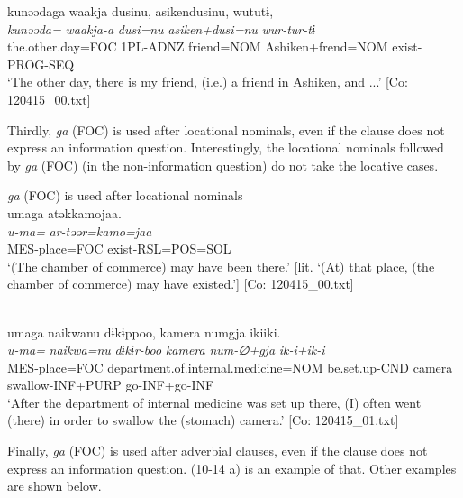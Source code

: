   \ex%
      \glll    kunəədaga  waakja  dusinu,  asikendusinu,                                     wututɨ,\\
      \textit{kunəəda=}  \textit{waakja-a}  \textit{dusi=nu}  \textit{asiken+dusi=nu}  \textit{wur-tur-tɨ}\\
      the.other.day=FOC  1PL-ADNZ  friend=NOM  Ashiken+frend=NOM                         exist-PROG-SEQ\\
      \glt       ‘The other day, there is my friend, (i.e.) a friend in Ashiken, and ...’ [Co: 120415\_00.txt]
    \z
\z

  Thirdly, \textit{ga} (FOC) is used after locational nominals, even if the clause does not express an information question. Interestingly, the locational nominals followed by \textit{ga} (FOC) (in the non-information question) do not take the locative cases.

\ea\label{ex:10.15}   \textit{ga} (FOC) is used after locational nominals\\
  \ea  %
      \glll    umaga  atəkkamojaa.\\
      \textit{u-ma=}  \textit{ar-təər=kamo=jaa}\\
      MES-place=FOC  exist-RSL=POS=SOL\\
      \glt       ‘(The chamber of commerce) may have been there.’ [lit. ‘(At) that place, (the chamber of commerce) may have existed.’] [Co: 120415\_00.txt]

  \ex\relax  [= (4-38 a)]\\
      \glll    umaga  naikwanu  dɨkɨppoo,   {\textbar}kamera{\textbar}  numgja  ikiiki.\\
      \textit{u-ma=}  \textit{naikwa=nu}  \textit{dɨkɨr-boo}    \textit{kamera}  \textit{num-∅+gja}  \textit{ik-i+ik-i}\\
      MES-place=FOC  department.of.internal.medicine=NOM  be.set.up-CND   camera  swallow-INF+PURP  go-INF+go-INF\\
      \glt       ‘After the department of internal medicine was set up there, (I) often went (there) in order to swallow the (stomach) camera.’ [Co: 120415\_01.txt]
    \z
\z

  Finally, \textit{ga} (FOC) is used after adverbial clauses, even if the clause does not express an information question. (10-14 a) is an example of that. Other examples are shown below.

